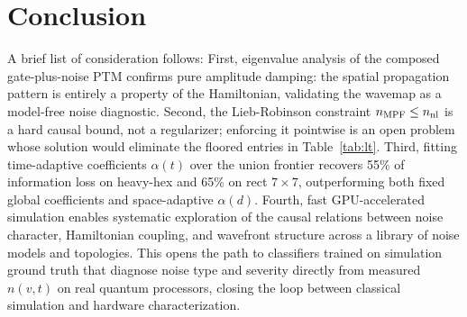 \documentclass[letterpaper]{article}
\begin{document}
\section{Conclusion}
\label{sec:conclusion}
A brief list of consideration follows: First, eigenvalue analysis of
the composed gate-plus-noise PTM confirms pure amplitude damping: the
spatial propagation pattern is entirely a property of the Hamiltonian,
validating the wavemap as a model-free noise diagnostic.  Second, the
Lieb-Robinson constraint $n_{\rm MPF}\leq n_{\rm nl}$ is a hard causal
bound, not a regularizer; enforcing it pointwise is an open problem
whose solution would eliminate the floored entries in
Table~\ref{tab:lt}.  Third, fitting time-adaptive coefficients
$\alpha(t)$ over the union frontier recovers 55\% of information loss
on heavy-hex and 65\% on rect $7\times7$, outperforming both fixed
global coefficients and space-adaptive $\alpha(d)$. Fourth, fast
GPU-accelerated simulation enables systematic exploration of the
causal relations between noise character, Hamiltonian coupling, and
wavefront structure across a library of noise models and topologies.
This opens the path to classifiers trained on simulation ground truth
that diagnose noise type and severity directly from measured $n(v,t)$
on real quantum processors, closing the loop between classical
simulation and hardware characterization.


\end{document}

